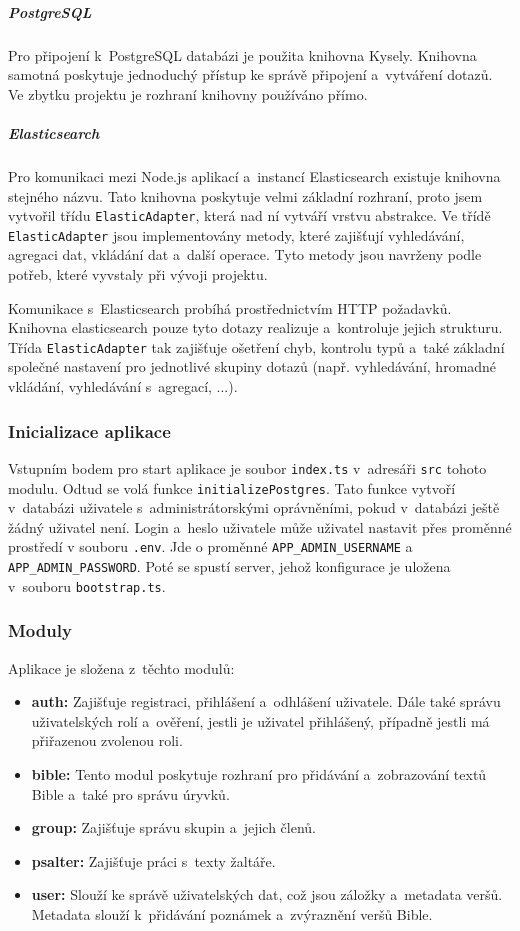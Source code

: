 \documentclass[
  tables=false,
  glossaries,
  index
]{kidiplom}
\begin{document}
\subparagraph{PostgreSQL}
Pro připojení k~PostgreSQL databázi je použita knihovna Kysely. Knihovna samotná poskytuje jednoduchý přístup ke správě připojení a~vytváření dotazů. Ve zbytku projektu je rozhraní knihovny používáno přímo.

\subparagraph{Elasticsearch}
Pro komunikaci mezi Node.js aplikací a~instancí Elasticsearch existuje knihovna stejného názvu. Tato knihovna poskytuje velmi základní rozhraní, proto jsem vytvořil třídu \texttt{ElasticAdapter}, která nad ní vytváří vrstvu abstrakce. Ve třídě \texttt{ElasticAdapter} jsou implementovány metody, které zajišťují vyhledávání, agregaci dat, vkládání dat a~další operace. Tyto metody jsou navrženy podle potřeb, které vyvstaly při vývoji projektu.

Komunikace s~Elasticsearch probíhá prostřednictvím HTTP požadavků. Knihovna elasticsearch pouze tyto dotazy realizuje a~kontroluje jejich strukturu. Třída \texttt{ElasticAdapter} tak zajišťuje ošetření chyb, kontrolu typů a~také základní společné nastavení pro jednotlivé skupiny dotazů (např. vyhledávání, hromadné vkládání, vyhledávání s~agregací, ...).

\subsubsection{Inicializace aplikace}
Vstupním bodem pro start aplikace je soubor \texttt{index.ts} v~adresáři \texttt{src} tohoto modulu. Odtud se volá funkce \texttt{initializePostgres}. Tato funkce vytvoří v~databázi uživatele s~administrátorskými oprávněními, pokud v~databázi ještě žádný uživatel není. Login a~heslo uživatele může uživatel nastavit přes proměnné prostředí v souboru \texttt{.env}. Jde o proměnné \texttt{APP\_ADMIN\_USERNAME} a \texttt{APP\_ADMIN\_PASSWORD}. Poté se spustí server, jehož konfigurace je uložena v~souboru \texttt{bootstrap.ts}.

\subsubsection{Moduly}
Aplikace je složena z~těchto modulů:
\begin{itemize}
	\item \textbf{auth: } Zajišťuje registraci, přihlášení a~odhlášení uživatele. Dále také správu uživatelských rolí a~ověření, jestli je uživatel přihlášený, případně jestli má přiřazenou zvolenou roli.
	\item \textbf{bible: } Tento modul poskytuje rozhraní pro přidávání a~zobrazování textů Bible a~také pro správu úryvků.
	\item \textbf{group: } Zajišťuje správu skupin a~jejich členů.
	\item \textbf{psalter: } Zajišťuje práci s~texty žaltáře.
	\item \textbf{user: } Slouží ke správě uživatelských dat, což jsou záložky a~metadata veršů. Metadata slouží k~přidávání poznámek a~zvýraznění veršů Bible.
\end{itemize}
\end{document}
